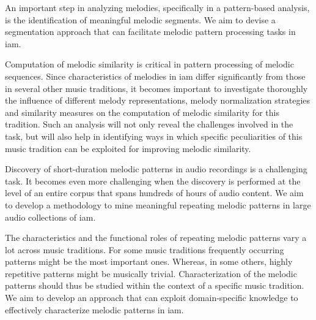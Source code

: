 An important step in analyzing melodies, specifically in a pattern-based analysis, is the identification of meaningful melodic segments. We aim to devise a segmentation approach that can facilitate melodic pattern processing tasks in \gls{iam}. 

Computation of melodic similarity is critical in pattern processing of melodic sequences. Since characteristics of melodies in \gls{iam} differ significantly from those in several other music traditions, it becomes important to investigate thoroughly the influence of different melody representations, melody normalization strategies and similarity measures on the computation of melodic similarity for this tradition. Such an analysis will not only reveal the challenges involved in the task, but will also help in identifying ways in which specific peculiarities of this music tradition can be exploited for improving melodic similarity.  

Discovery of short-duration melodic patterns in audio recordings is a challenging task. It becomes even more challenging when the discovery is performed at the level of an entire corpus that spans hundreds of hours of audio content. We aim to develop a methodology to mine meaningful repeating melodic patterns in large audio collections of \gls{iam}. 

The characteristics and the functional roles of repeating melodic patterns vary a lot across music traditions. For some music traditions frequently occurring patterns might be the most important ones. Whereas, in some others, highly repetitive patterns might be musically trivial. Characterization of the melodic patterns should thus be studied within the context of a specific music tradition. We aim to develop an approach that can exploit domain-specific knowledge to effectively characterize melodic patterns in \gls{iam}.

